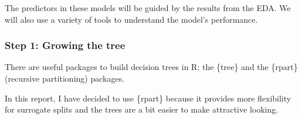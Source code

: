 \documentclass[
]{article}
\newenvironment{Shaded}{\begin{snugshade}}{\end{snugshade}}
\newcommand{\AttributeTok}[1]{\textcolor[rgb]{0.13,0.29,0.53}{#1}}
\newcommand{\CommentTok}[1]{\textcolor[rgb]{0.56,0.35,0.01}{\textit{#1}}}
\newcommand{\DecValTok}[1]{\textcolor[rgb]{0.00,0.00,0.81}{#1}}
\newcommand{\DocumentationTok}[1]{\textcolor[rgb]{0.56,0.35,0.01}{\textbf{\textit{#1}}}}
\newcommand{\FloatTok}[1]{\textcolor[rgb]{0.00,0.00,0.81}{#1}}
\newcommand{\FunctionTok}[1]{\textcolor[rgb]{0.13,0.29,0.53}{\textbf{#1}}}
\newcommand{\NormalTok}[1]{#1}
\newcommand{\OtherTok}[1]{\textcolor[rgb]{0.56,0.35,0.01}{#1}}
\newcommand{\SpecialCharTok}[1]{\textcolor[rgb]{0.81,0.36,0.00}{\textbf{#1}}}
\begin{document}
The predictors in these models will be guided by the results from the
EDA. We will also use a variety of tools to understand the model's
performance.

\begin{Shaded}
\end{Shaded}

\hypertarget{step-1-growing-the-tree}{%
\subsubsection{Step 1: Growing the tree}\label{step-1-growing-the-tree}}

There are useful packages to build decision trees in R: the \{tree\} and
the \{rpart\} (recursive partitioning) packages.

In this report, I have decided to use \{rpart\} because it provides more
flexibility for surrogate splits and the trees are a bit easier to make
attractive looking.
\end{document}
